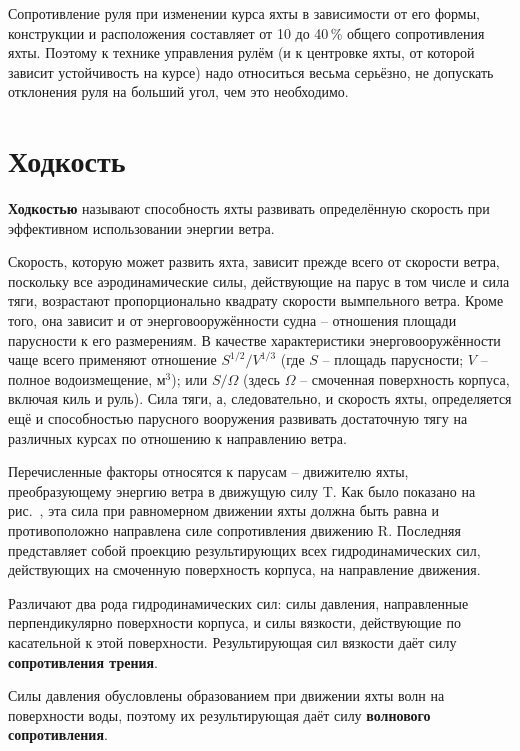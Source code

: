 Сопротивление руля при изменении курса яхты в зависимости от его
формы, конструкции и расположения составляет от 10 до 40\,\% общего
сопротивления яхты. Поэтому к технике управления рулём (и к центровке
яхты, от которой зависит устойчивость на курсе) надо относиться весьма
серьёзно, не допускать отклонения руля на больший угол, чем это
необходимо.

\section{Ходкость}

\textbf{Ходкостью} называют способность яхты развивать
определённую скорость при эффективном использовании энергии ветра.

Скорость, которую может развить яхта, зависит прежде всего от скорости
ветра, поскольку все аэродинамические силы, действующие на парус в том
числе и сила тяги, возрастают пропорционально квадрату скорости
вымпельного ветра. Кроме того, она зависит и от энерговооружённости
судна \--- отношения площади парусности к его размерениям. В качестве
характеристики энерговооружённости чаще всего применяют отношение
$S^{1/2} / V^{1/3}$ (где $S$ \--- площадь парусности\msq; $V$ \---
полное водоизмещение, м$^3$); или $S / \Omega$ (здесь $\Omega$ \---
смоченная поверхность корпуса, включая киль и руль). Сила тяги, а,
следовательно, и скорость яхты, определяется ещё и способностью
парусного вооружения развивать достаточную тягу на различных курсах по
отношению к направлению ветра.

Перечисленные факторы относятся к парусам \--- движителю яхты,
преобразующему энергию ветра в движущую силу \ve T. Как было показано
на рис.~, эта сила при равномерном движении яхты должна быть
равна и противоположно направлена силе сопротивления движению \ve
R. Последняя представляет собой проекцию результирующих всех
гидродинамических сил, действующих на смоченную поверхность корпуса,
на направление движения.

Различают два рода гидродинамических сил: силы давления, направленные
перпендикулярно поверхности корпуса, и силы вязкости, действующие по
касательной к этой поверхности. Результирующая сил вязкости даёт силу
\textbf{сопротивления трения}.

Силы давления обусловлены образованием при движении яхты волн на
поверхности воды, поэтому их результирующая даёт силу
\textbf{волнового сопротивления}.

